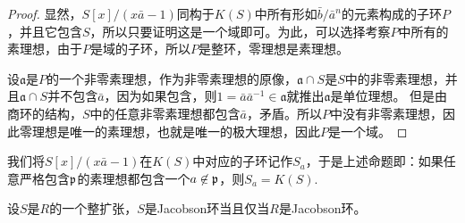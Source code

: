 \begin{proof} 显然，$S[x]/(x\bar{a}-1)$同构于$K(S)$中所有形如$\bar{b}/\bar{a}^n$的元素构成的子环$P$，并且它包含$S$，所以只要证明这是一个域即可。为此，可以选择考察$P$中所有的素理想，由于$P$是域的子环，所以$P$是整环，零理想是素理想。

设$\mathfrak{a}$是$P$的一个非零素理想，作为非零素理想的原像，$\mathfrak{a}\cap S$是$S$中的非零素理想，并且$\mathfrak{a}\cap S$并不包含$\bar{a}$，因为如果包含，则$1=\bar{a}\bar{a}^{-1}\in \mathfrak{a}$就推出$\mathfrak{a}$是单位理想。 但是由商环的结构，$S$中的任意非零素理想都包含$\bar{a}$，矛盾。所以$P$中没有非零素理想，因此零理想是唯一的素理想，也就是唯一的极大理想，因此$P$是一个域。\end{proof}

我们将$S[x]/(x\bar{a}-1)$在$K(S)$中对应的子环记作$S_a$，于是上述命题即：如果任意严格包含$\mathfrak{p}$的素理想都包含一个$a\not\in \mathfrak{p}$，则$S_a=K(S)$. 

\begin{pro}
设$S$是$R$的一个整扩张，$S$是Jacobson环当且仅当$R$是Jacobson环。
\end{pro}

